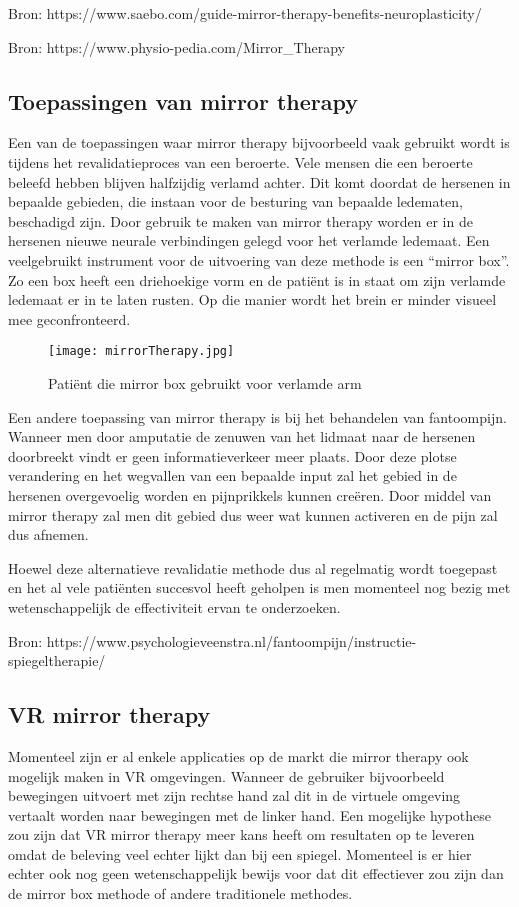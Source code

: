 Bron: https://www.saebo.com/guide-mirror-therapy-benefits-neuroplasticity/

Bron: https://www.physio-pedia.com/Mirror\_Therapy

\subsection{Toepassingen van mirror therapy}
Een van de toepassingen waar mirror therapy bijvoorbeeld vaak gebruikt wordt is tijdens het revalidatieproces van een beroerte.  Vele mensen die een beroerte beleefd hebben blijven halfzijdig verlamd achter. Dit komt doordat de hersenen in bepaalde gebieden, die instaan voor de besturing van bepaalde ledematen, beschadigd zijn. Door gebruik te maken van mirror therapy worden er in de hersenen nieuwe neurale verbindingen gelegd voor het verlamde ledemaat. Een veelgebruikt instrument voor de uitvoering van deze methode is een “mirror box”. Zo een box heeft een driehoekige vorm en de patiënt is in staat om zijn verlamde ledemaat er in te laten rusten. Op die manier wordt het brein er minder visueel mee geconfronteerd.

\begin{figure}[h]
    \centering
    \texttt{[image: mirrorTherapy.jpg]}
    \caption{Patiënt die mirror box gebruikt voor verlamde arm}
\end{figure}


Een andere toepassing van mirror therapy is bij het behandelen van fantoompijn. Wanneer men door amputatie de zenuwen van het lidmaat naar de hersenen doorbreekt vindt er geen informatieverkeer meer plaats. Door deze plotse verandering en het wegvallen van een bepaalde input zal het gebied in de hersenen overgevoelig worden en pijnprikkels kunnen creëren. Door middel van mirror therapy zal men dit gebied dus weer wat kunnen activeren en de pijn zal dus afnemen.

Hoewel deze alternatieve revalidatie methode dus al regelmatig wordt toegepast en het al vele patiënten succesvol heeft geholpen is men momenteel nog bezig met wetenschappelijk de effectiviteit ervan te onderzoeken.

Bron: https://www.psychologieveenstra.nl/fantoompijn/instructie-spiegeltherapie/

\subsection{VR mirror therapy}
Momenteel zijn er al enkele applicaties op de markt die mirror therapy ook mogelijk maken in VR omgevingen. Wanneer de gebruiker bijvoorbeeld bewegingen uitvoert met zijn rechtse hand zal dit in de virtuele omgeving vertaalt worden naar bewegingen met de linker hand. Een mogelijke hypothese zou zijn dat VR mirror therapy meer kans heeft om resultaten op te leveren omdat de beleving veel echter lijkt dan bij een spiegel. Momenteel is er hier echter ook nog geen wetenschappelijk bewijs voor dat dit effectiever zou zijn dan de mirror box methode of andere traditionele methodes. 

